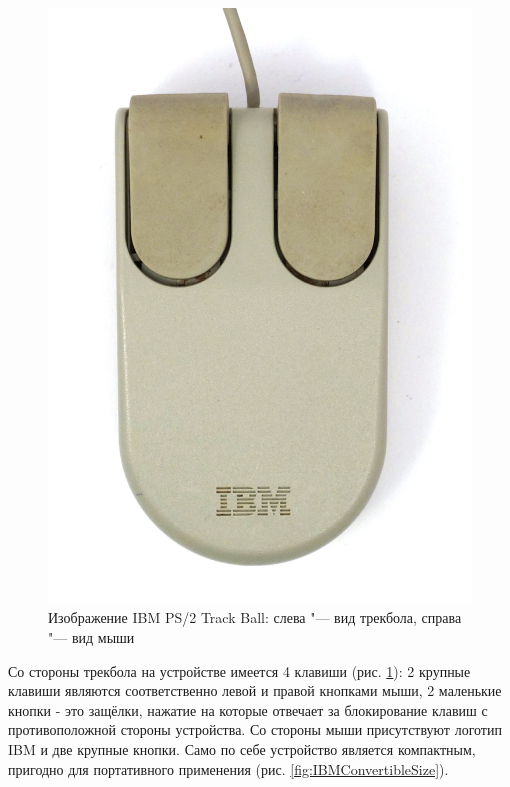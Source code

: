 \documentclass[11pt, a4paper]{article}
\begin{document}
\begin{figure}[h]
    \includegraphics[scale=0.5]{1992_ibm_convertible/bottom_60.jpg}
    \caption{Изображение IBM PS/2 Track Ball: слева "--- вид трекбола, справа "--- вид мыши}
    \label{fig:IBMConvertibleTopAndBottom}
\end{figure}

Со стороны трекбола на устройстве имеется 4 клавиши (рис. \ref{fig:IBMConvertibleTopAndBottom}): 2 крупные клавиши являются соответственно левой и правой кнопками мыши, 2 маленькие кнопки - это защёлки, нажатие на которые отвечает за блокирование клавиш с противоположной стороны устройства. Со стороны мыши присутствуют логотип IBM и две крупные кнопки. Само по себе устройство является компактным, пригодно для портативного применения (рис. \ref{fig:IBMConvertibleSize}).
\end{document}
